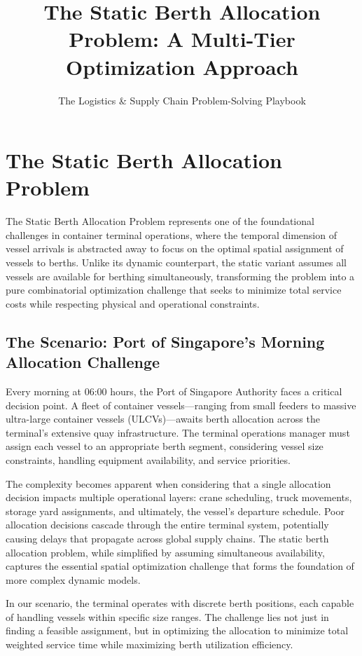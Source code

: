 \documentclass{article}
\title{The Static Berth Allocation Problem: A Multi-Tier Optimization Approach}
\author{The Logistics \& Supply Chain Problem-Solving Playbook}
\date{}
\begin{document}
\maketitle

\section{The Static Berth Allocation Problem}

The Static Berth Allocation Problem represents one of the foundational challenges in container terminal operations, where the temporal dimension of vessel arrivals is abstracted away to focus on the optimal spatial assignment of vessels to berths. Unlike its dynamic counterpart, the static variant assumes all vessels are available for berthing simultaneously, transforming the problem into a pure combinatorial optimization challenge that seeks to minimize total service costs while respecting physical and operational constraints.

\subsection{The Scenario: Port of Singapore's Morning Allocation Challenge}

Every morning at 06:00 hours, the Port of Singapore Authority faces a critical decision point. A fleet of container vessels—ranging from small feeders to massive ultra-large container vessels (ULCVs)—awaits berth allocation across the terminal's extensive quay infrastructure. The terminal operations manager must assign each vessel to an appropriate berth segment, considering vessel size constraints, handling equipment availability, and service priorities.

The complexity becomes apparent when considering that a single allocation decision impacts multiple operational layers: crane scheduling, truck movements, storage yard assignments, and ultimately, the vessel's departure schedule. Poor allocation decisions cascade through the entire terminal system, potentially causing delays that propagate across global supply chains. The static berth allocation problem, while simplified by assuming simultaneous availability, captures the essential spatial optimization challenge that forms the foundation of more complex dynamic models.

In our scenario, the terminal operates with discrete berth positions, each capable of handling vessels within specific size ranges. The challenge lies not just in finding a feasible assignment, but in optimizing the allocation to minimize total weighted service time while maximizing berth utilization efficiency.
\end{document}

